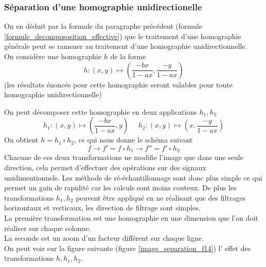 \subsubsection{Séparation d'une homographie unidirectionelle}
\label{homobox_paragraph}
On en déduit par la formule du paragraphe précédent (formule \ref{formule_decompososition_effective}) que le traitement d'une homographie générale peut se ramener au traitement d'une homographie  unidirectionnelle.\\
On considère une homographie  $h$ de la forme 
\begin{equation*}
h:(x,y)\mapsto \left(\frac{-bx}{1-ax},\frac{-y}{1-ax}\right)
\end{equation*}
(les résultats énoncés pour cette homographie seront valables pour toute homographie unidirectionnelle)

On peut décomposer cette homographie en deux applications $h_1 , h_2$
\begin{equation*}
h_1:(x,y) \mapsto \left(\frac{-bx}{1-ax},y\right)~~~~~~h_2:(x,y) \mapsto \left(x,\frac{-y}{1-ax}\right)
\end{equation*}
On obtient $h=h_1  \circ h_2$, ce qui nous donne le schéma suivant 
\begin{equation*}
f\longrightarrow f'=f\circ h_1 \longrightarrow f''=f'\circ h_2
\end{equation*}
Chacune de ces deux transformations ne modifie l'image que dans une seule direction, cela permet d'effectuer des opérations sur des signaux unidimentionnels. Les méthode de ré-échantillonnage sont donc plus simple ce qui permet un gain de rapidité car les calculs sont moins couteux. De plus les transformations $h_1,h_2$ peuvent être appliqué en ne réalisant que des filtrages horizontaux et verticaux, les direction de filtrage sont simples.\\ 
La première transformation est une homographie en une dimension que l'on doit réaliser sur chaque colonne.\\ 
La seconde est un zoom d'un facteur différent sur chaque ligne.\\
On peut voir sur la figure suivante (figure  \ref{image_separation_f14}) l' effet des transformations $h,h_1,h_2$.\\

